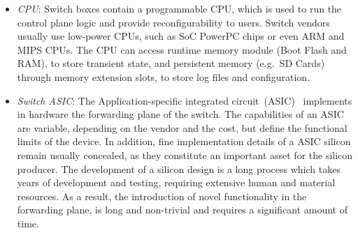 \begin{itemize}
  \item \emph{CPU}: Switch boxes contain a programmable CPU, which is used to
        run the control plane logic and provide reconfigurability to users.
        Switch vendors usually use low-power CPUs, such as SoC PowerPC chips or
        even ARM and MIPS CPUs. The CPU can access runtime memory
        module (Boot Flash and RAM), to store transient state, and persistent
        memory (e.g.~SD Cards) through memory extension slots, to store log
        files and configuration.
  \item \emph{Switch ASIC}: The Application-specific integrated
        circuit~(ASIC)~\cite{hp-asic,broadcom-asic,intel-asic} implements in
        hardware the forwarding plane of the switch.  The capabilities of an
        ASIC are variable, depending on the vendor and the cost, but define the
        functional limits of the device. In addition, fine implementation
        details of a ASIC silicon remain usually concealed, as they constitute an
        important asset for the silicon producer.  The development of a silicon
        design is a long process which takes years of development and testing,
        requiring extensive human and material resources. As a result, the
        introduction of novel functionality in the forwarding plane, is long and
        non-trivial and requires a significant amount of time. 


\end{itemize}
